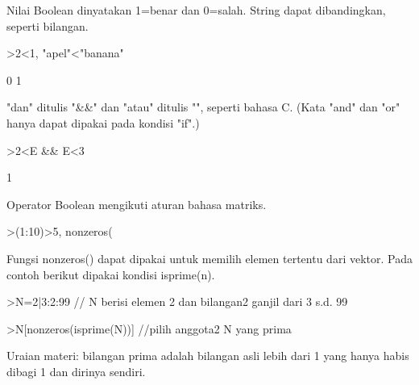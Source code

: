 \documentclass[a4paper,10pt]{article}
\begin{document}
\begin{eulernotebook}
\begin{eulercomment}
\end{eulercomment}
\begin{eulercomment}
Nilai Boolean dinyatakan 1=benar dan 0=salah. String dapat dibandingkan,
seperti bilangan.
\end{eulercomment}
\begin{eulerprompt}
>2<1, "apel"<"banana"
\end{eulerprompt}
\begin{euleroutput}
  0
  1
\end{euleroutput}
\begin{eulercomment}
"dan" ditulis "\&\&" dan "atau" ditulis "\textbar{}\textbar{}", seperti bahasa C. (Kata "and"
dan "or" hanya dapat dipakai pada kondisi "if".)
\end{eulercomment}
\begin{eulerprompt}
>2<E && E<3
\end{eulerprompt}
\begin{euleroutput}
  1
\end{euleroutput}
\begin{eulercomment}
Operator Boolean mengikuti aturan bahasa matriks.
\end{eulercomment}
\begin{eulerprompt}
>(1:10)>5, nonzeros(%
\end{eulerprompt}
\begin{euleroutput}
  [0,  0,  0,  0,  0,  1,  1,  1,  1,  1]
  [6,  7,  8,  9,  10]
\end{euleroutput}
\begin{eulercomment}
Fungsi nonzeros() dapat dipakai untuk memilih elemen tertentu dari vektor.
Pada contoh berikut dipakai kondisi isprime(n).
\end{eulercomment}
\begin{eulerprompt}
>N=2|3:2:99 // N berisi elemen 2 dan bilangan2 ganjil dari 3 s.d. 99
\end{eulerprompt}
\begin{euleroutput}
  [2,  3,  5,  7,  9,  11,  13,  15,  17,  19,  21,  23,  25,  27,  29,
  31,  33,  35,  37,  39,  41,  43,  45,  47,  49,  51,  53,  55,  57,
  59,  61,  63,  65,  67,  69,  71,  73,  75,  77,  79,  81,  83,  85,
  87,  89,  91,  93,  95,  97,  99]
\end{euleroutput}
\begin{eulerprompt}
>N[nonzeros(isprime(N))] //pilih anggota2 N yang prima
\end{eulerprompt}
\begin{euleroutput}
  [2,  3,  5,  7,  11,  13,  17,  19,  23,  29,  31,  37,  41,  43,  47,
  53,  59,  61,  67,  71,  73,  79,  83,  89,  97]
\end{euleroutput}
\begin{eulercomment}
Uraian materi: bilangan prima adalah bilangan asli lebih dari 1 yang hanya
habis dibagi 1 dan dirinya sendiri.


\end{eulercomment}
\end{eulernotebook}
\end{document}
